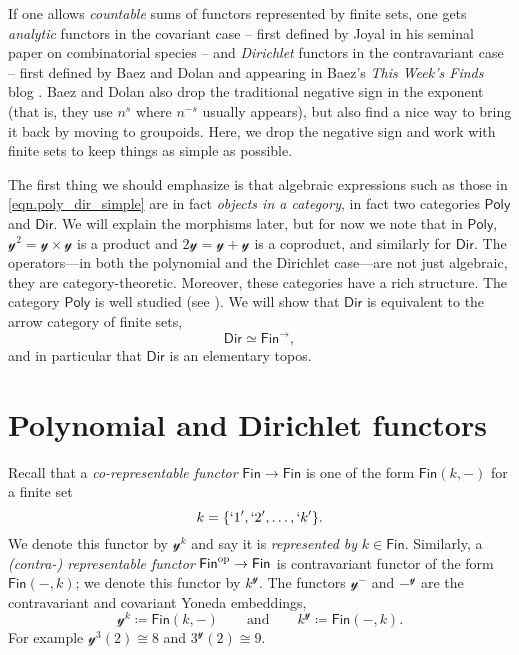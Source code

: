 \documentclass[11pt, article, one side]{memoir}
\theoremstyle{theorem}
\theoremstyle{definition}
\theoremstyle{remark}
\newcommand{\Cat}[1]{\mathsf{#1}}%
\newcommand{\op}{^\tn{op}}
\newcommand{\tn}[1]{\textnormal{#1}}
\newcommand{\finset}{\Cat{Fin}}
\newcommand{\yon}{\mathcal{y}}
\newcommand{\poly}{\Cat{Poly}}
\newcommand{\dir}{\Cat{Dir}}
\newcommand{\qqand}{\qquad\text{and}\qquad}
\begin{document}
If one allows \emph{countable} sums of functors represented by finite sets, one gets \emph{analytic} functors in the covariant case -- first defined by Joyal in his seminal paper on combinatorial species \cite{J:Combinatorial.Species} -- and \emph{Dirichlet} functors in the contravariant case -- first defined by Baez and Dolan and appearing in Baez's \emph{This Week's Finds} blog \cite{BD:This.Weeks.Finds.300}. Baez and Dolan also drop the traditional negative sign in the exponent (that is, they use $n^s$ where $n^{-s}$ usually appears), but also find a nice way to bring it back by moving to groupoids. Here, we drop the negative sign and work with finite sets to keep things as simple as possible.

The first thing we should emphasize is that algebraic expressions such as those in \cref{eqn.poly_dir_simple} are in fact \emph{objects in a category}, in fact two categories $\poly$ and $\dir$. We will explain the morphisms later, but for now we note that in $\poly$, $\yon^2=\yon\times\yon$ is a product and $2\yon=\yon+\yon$ is a coproduct, and similarly for $\dir$. The operators---in both the polynomial and the Dirichlet case---are not just algebraic, they are category-theoretic. Moreover, these categories have a rich structure. The category $\poly$ is well studied (see \cite{GK:Polynomial.Functors}). We will show that $\dir$ is equivalent to the arrow category of finite sets, 
$$\dir \simeq \finset^{\to},$$
and in particular that $\dir$ is an elementary topos.


\chapter{Polynomial and Dirichlet functors}

Recall that a \emph{co-representable functor} $\finset\to\finset$ is one of the form $\finset(k, -)$ for a finite set
\[k=\{`1', `2',\ldots,`k'\}.\]
We denote this functor by $\yon^k$ and say it is \emph{represented by} $k\in\finset$. Similarly, a \emph{(contra-) representable functor} $\finset\op\to\finset$ is contravariant functor of the form $\finset(-,k)$; we denote this functor by $k^\yon$. The functors $\yon^-$ and $-^\yon$ are the contravariant and covariant Yoneda embeddings,
\[
  \yon^k \coloneqq \finset(k,-)
  \qqand
  k^\yon\coloneqq\finset(-,k).
\]
For example $\yon^3(2)\cong8$ and $3^\yon(2)\cong9$.
\end{document}
